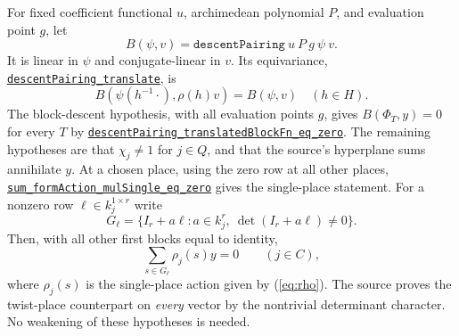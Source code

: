 \documentclass[11pt,letterpaper]{article}
\newcommand{\baseurl}{https://github.com/VladimirReshetnikov/ProveIt/blob/9050b04000647d588d0c78d945180abcd3b0bcf7/Analysis/GeneralizedRiemannHypothesis/}
\newcommand{\src}[3]{\href{\baseurl Lean/grh/src/#1.lean\#L#2}{#3}}
\newcommand{\bottomref}[2]{\src{New/OneLift/FalseLifts/BottomOfTower}{#1}{#2}}
\begin{document}
For fixed coefficient functional $u$, archimedean polynomial $P$, and evaluation point $g$, let
\[
 B(\psi,v)=\texttt{descentPairing}\ u\ P\ g\ \psi\ v.
\]
It is linear in $\psi$ and conjugate-linear in $v$. Its equivariance, \bottomref{1103}{\texttt{descentPairing\_translate}}, is
\begin{equation}\label{eq:equiv}
 B(\psi(h^{-1}\cdot),\rho(h)v)=B(\psi,v)\quad(h\in H).
\end{equation}
The block-descent hypothesis, with all evaluation points $g$, gives $B(\Phi_T,y)=0$ for every $T$ by \bottomref{1185}{\texttt{descentPairing\_translatedBlockFn\_eq\_zero}}. The remaining hypotheses are that $\chi_j\ne 1$ for $j\in Q$, and that the source's hyperplane sums annihilate $y$. At a chosen place, using the zero row at all other places, \bottomref{1296}{\texttt{sum\_formAction\_mulSingle\_eq\_zero}} gives the single-place statement. For a nonzero row $\ell\in k_j^{1\times r}$ write
\[
 G_\ell=\{I_r+a\ell:a\in k_j^r,\ \det(I_r+a\ell)\ne0\}.
\]
Then, with all other first blocks equal to identity,
\begin{equation}\label{eq:hyper}
 \sum_{s\in G_\ell}\rho_j(s)y=0\qquad(j\in C),
\end{equation}
where $\rho_j(s)$ is the single-place action given by (\ref{eq:rho}). The source proves the twist-place counterpart on \emph{every} vector by the nontrivial determinant character. No weakening of these hypotheses is needed.
\end{document}
